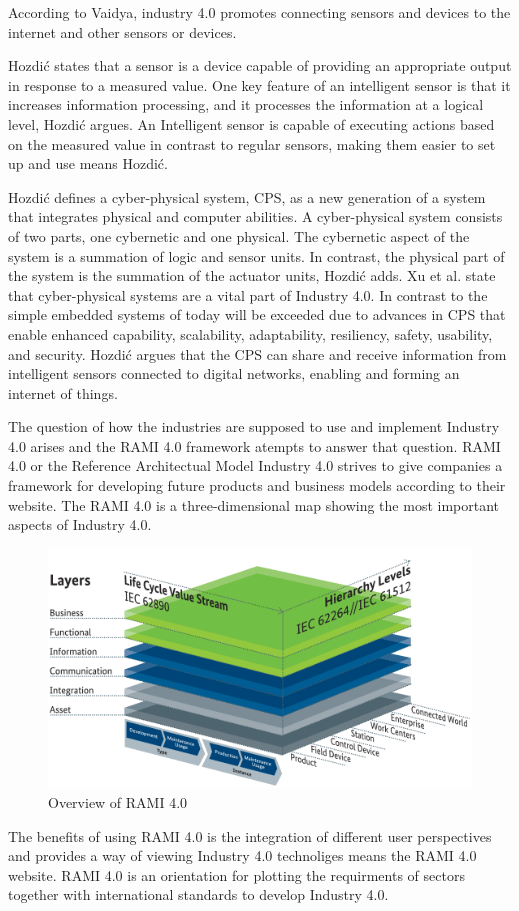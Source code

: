 According to Vaidya, industry 4.0 promotes connecting sensors and devices to the internet and other sensors or devices\cite{Vaidya2018}.

Hozdić states that a sensor is a device capable of providing an appropriate output in response to a measured value\cite{Hozdic2015}.
One key feature of an intelligent sensor is that it increases information processing, and it processes the information at a logical level, Hozdić argues.
An Intelligent sensor  is capable of executing actions based on the measured value in contrast to regular sensors, making them easier to set up and use means Hozdić. 

Hozdić defines a cyber-physical system, CPS, as a new generation of a system that integrates physical and computer abilities\cite{Hozdic2015}.
A cyber-physical system consists of two parts, one cybernetic and one physical.
The cybernetic aspect of the system is a summation of logic and sensor units. In contrast, the physical part of the system is the summation of the actuator units, Hozdić adds.
Xu et al. state that cyber-physical systems are a vital part of Industry 4.0. In contrast to the simple embedded systems of today will be exceeded due to advances in CPS that enable enhanced capability, scalability, adaptability, resiliency, safety, usability, and security.\cite{Xu2018}
Hozdić argues that the CPS can share and receive information from intelligent sensors connected to digital networks, enabling and forming an internet of things.

The question of how the industries are supposed to use and implement Industry 4.0 arises and the RAMI 4.0 framework atempts to answer that question.
RAMI 4.0 or the Reference Architectual Model Industry 4.0 strives to give companies a framework for developing future products and business models according to their website\cite{RAMI2021}.
The RAMI 4.0 is a three-dimensional map showing the most important aspects of Industry 4.0. 
\begin{figure}[H]
    \centering
    \includegraphics[width=\textwidth]{Pictures/RAMI.png} 
    \caption{Overview of RAMI 4.0}
    \label{Indutrial revolutions}
\end{figure}
The benefits of using RAMI 4.0 is the integration of different user perspectives and provides a way of viewing Industry 4.0 technoliges means the RAMI 4.0 website.
RAMI 4.0 is an orientation for plotting the requirments of sectors together with international standards to develop Industry 4.0.
